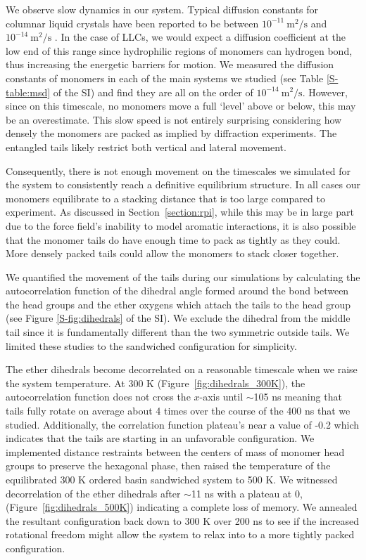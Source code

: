 \documentclass[journal=jpcbfk,manuscript=article]{achemso}
\begin{document}
  We observe slow dynamics in our system. Typical diffusion constants for
  columnar liquid crystals have been reported to be between $10^{-11}~
  \mathrm{m}^2/\mathrm{s}$ \cite{dong_translational_1984} and
  $10^{-14}~\mathrm{m}^2/\mathrm{s}$ \cite{dvinskikh_molecular_2002}.  In the
  case of LLCs, we would expect a diffusion coefficient at the low end of this
  range since hydrophilic regions of monomers can hydrogen bond, thus increasing
  the energetic barriers for motion. We measured the diffusion constants of
  monomers in each of the main systems we studied (see Table \ref{S-table:msd} of
  the SI) and find they are all on the order of
  $10^{-14}~\mathrm{m}^2/\mathrm{s}$. However, since on this timescale, no
  monomers move a full `level' above or below, this may be an overestimate. This
  slow speed is not entirely surprising considering how densely the monomers are
  packed as implied by diffraction experiments. The entangled tails likely
  restrict both vertical and lateral movement.

  Consequently, there is not enough movement on the timescales we simulated for
  the system to consistently reach a definitive equilibrium structure. In all
  cases our monomers equilibrate to a stacking distance that is too large
  compared to experiment.  As discussed in Section~\ref{section:rpi}, while this
  may be in large part due to the force field's inability to model aromatic
  interactions, it is also possible that the monomer tails do have enough time to
  pack as tightly as they could. More densely packed tails could allow the
  monomers to stack closer together. 
  
  We quantified the movement of the tails during our simulations by calculating the 
  autocorrelation function of the dihedral angle formed around the bond between the 
  head groups and the ether oxygens which attach the tails to the head group 
  (see Figure \ref{S-fig:dihedrals} of the SI). We exclude the dihedral from the middle tail 
  since it is fundamentally different than the two symmetric outside tails. We 
  limited these studies to the sandwiched configuration for simplicity.
  
  The ether dihedrals become decorrelated on a reasonable timescale when we raise
  the system temperature. At 300 K (Figure~\ref{fig:dihedrals_300K}), the autocorrelation function does
  not cross the $x$-axis until $\sim$105 ns meaning that tails fully rotate on average about 
  4 times over the course of the 400 ns that we studied. Additionally, the correlation 
  function plateau's near a value of -0.2 which indicates that the tails are starting in 
  an unfavorable configuration. We implemented distance restraints between the centers of 
  mass of monomer head groups to preserve the hexagonal phase, then raised the temperature 
  of the equilibrated 300 K ordered basin sandwiched system to 500 K. We witnessed 
  decorrelation of the ether dihedrals after $\sim$11 ns with a plateau at 0, 
  (Figure~\ref{fig:dihedrals_500K}) indicating a complete loss of memory. We annealed
  the resultant configuration back down to 300 K over 200 ns to see if the increased rotational
  freedom might allow the system to relax into to a more tightly packed configuration.
  
\end{document}
